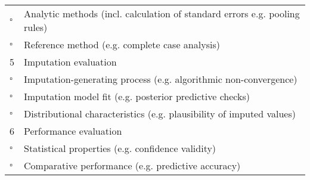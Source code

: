 \documentclass[bimj,fleqn]{w-art}
\begin{document}
\begin{table}[ht]
\begin{tabular}{ll}
$\square$  & Analytic methods (incl. calculation of standard errors e.g. pooling   rules)       \\
$\square$  & Reference method (e.g. complete case analysis)                                    \\ \hline 
5 & Imputation evaluation                                                              \\ \cline{2-2}
$\square$  & Imputation-generating process (e.g. algorithmic non-convergence)                   \\
$\square$  & Imputation model fit (e.g. posterior predictive checks)                            \\
$\square$  & Distributional characteristics (e.g. plausibility of imputed values)               \\ \hline 
6 & Performance evaluation                                                             \\ \cline{2-2}
$\square$  & Statistical properties (e.g. confidence validity)                                  \\
$\square$  & Comparative performance (e.g. predictive accuracy)                                 \\ \hline
\end{tabular}
\end{table}





\end{document}

